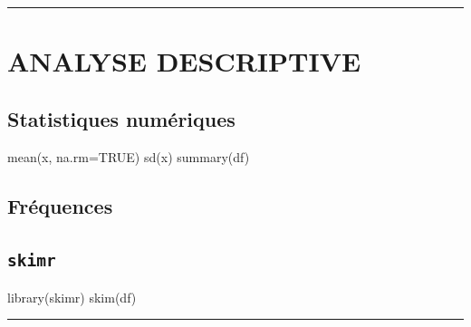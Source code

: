 \documentclass[
  8pt,
  letterpaper,
  DIV=11,
  numbers=noendperiod]{scrartcl}
\newenvironment{Shaded}{\begin{snugshade}}{\end{snugshade}}
\newcommand{\AttributeTok}[1]{\textcolor[rgb]{0.40,0.45,0.13}{#1}}
\newcommand{\ConstantTok}[1]{\textcolor[rgb]{0.56,0.35,0.01}{#1}}
\newcommand{\FunctionTok}[1]{\textcolor[rgb]{0.28,0.35,0.67}{#1}}
\newcommand{\NormalTok}[1]{\textcolor[rgb]{0.00,0.23,0.31}{#1}}
\newcommand{\SpecialCharTok}[1]{\textcolor[rgb]{0.37,0.37,0.37}{#1}}
\begin{document}
\begin{center}\rule{0.5\linewidth}{0.5pt}\end{center}

\section{ANALYSE DESCRIPTIVE}\label{analyse-descriptive}

\subsection{Statistiques numériques}\label{statistiques-numuxe9riques}

\begin{Shaded}
\begin{Highlighting}[]
\FunctionTok{mean}\NormalTok{(x, }\AttributeTok{na.rm=}\ConstantTok{TRUE}\NormalTok{)}
\FunctionTok{sd}\NormalTok{(x)}
\FunctionTok{summary}\NormalTok{(df)}
\end{Highlighting}
\end{Shaded}

\subsection{Fréquences}\label{fruxe9quences}

\begin{Shaded}
\end{Shaded}

\subsection{\texorpdfstring{\texttt{skimr}}{skimr}}\label{skimr}

\begin{Shaded}
\begin{Highlighting}[]
\FunctionTok{library}\NormalTok{(skimr)}
\FunctionTok{skim}\NormalTok{(df)}
\end{Highlighting}
\end{Shaded}

\begin{center}\rule{0.5\linewidth}{0.5pt}\end{center}
\end{document}
